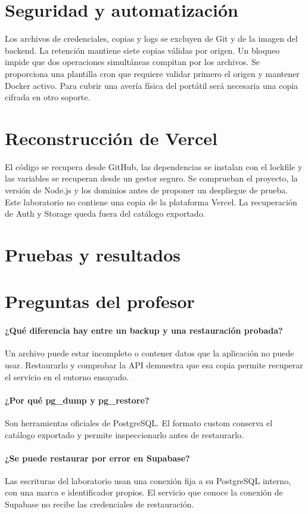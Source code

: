 \documentclass[11pt,a4paper]{article}
\begin{document}
\section{Seguridad y automatización}
Los archivos de credenciales, copias y logs se excluyen de Git y de la imagen del backend. La retención mantiene siete copias válidas por origen. Un bloqueo impide que dos operaciones simultáneas compitan por los archivos. Se proporciona una plantilla cron que requiere validar primero el origen y mantener Docker activo. Para cubrir una avería física del portátil será necesaria una copia cifrada en otro soporte.

\section{Reconstrucción de Vercel}
El código se recupera desde GitHub, las dependencias se instalan con el lockfile y las variables se recuperan desde un gestor seguro. Se comprueban el proyecto, la versión de Node.js y los dominios antes de proponer un despliegue de prueba. Este laboratorio no contiene una copia de la plataforma Vercel. La recuperación de Auth y Storage queda fuera del catálogo exportado.

\section{Pruebas y resultados}


\section{Preguntas del profesor}
\paragraph{¿Qué diferencia hay entre un backup y una restauración probada?}
Un archivo puede estar incompleto o contener datos que la aplicación no puede usar. Restaurarlo y comprobar la API demuestra que esa copia permite recuperar el servicio en el entorno ensayado.
\paragraph{¿Por qué pg\_dump y pg\_restore?}
Son herramientas oficiales de PostgreSQL. El formato custom conserva el catálogo exportado y permite inspeccionarlo antes de restaurarlo.
\paragraph{¿Se puede restaurar por error en Supabase?}
Las escrituras del laboratorio usan una conexión fija a su PostgreSQL interno, con una marca e identificador propios. El servicio que conoce la conexión de Supabase no recibe las credenciales de restauración.
\end{document}

